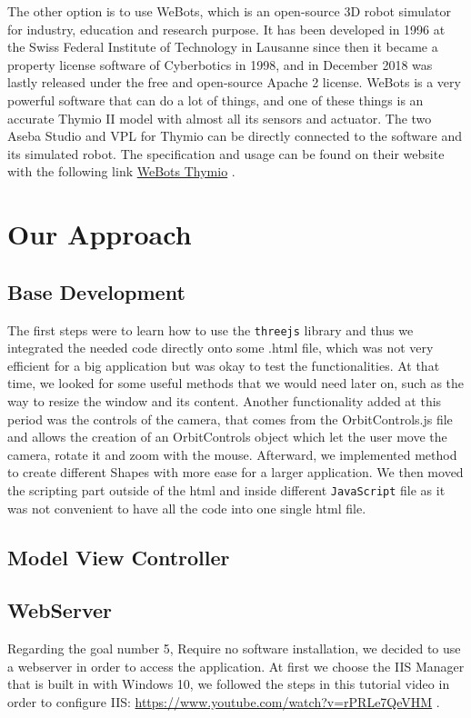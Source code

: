 \documentclass{scrbook}
\begin{document}
The other option is to use WeBots, which is an open-source 3D robot simulator for industry, education and research purpose. 
It has been developed in 1996 at the Swiss Federal Institute of Technology in Lausanne since then it became a property license software of Cyberbotics in 1998, 
and in December 2018 was lastly released under the free and open-source Apache 2 license.
WeBots is a very powerful software that can do a lot of things, and one of these things is an accurate Thymio II model with almost all its sensors and actuator. 
The two Aseba Studio and VPL for Thymio can be directly connected to the software and its simulated robot. 
The specification and usage can be found on their website with the following link \href{https://www.cyberbotics.com/doc/guide/thymio2#mosybas-thymio-ii}{WeBots Thymio} .

\chapter{Our Approach}

\section{Base Development}

The first steps were to learn how to use the \texttt{threejs} library and thus we integrated the needed code directly onto some .html file, which was not very efficient for a big application but was okay to test the functionalities. 
At that time, we looked for some useful methods that we would need later on, such as the way to resize the window and its content. Another functionality added at this period was the controls of the camera, that comes from the OrbitControls.js file and allows the creation of an OrbitControls object which let the user move the camera, rotate it and zoom with the mouse.
Afterward, we implemented method to create different Shapes with more ease for a larger application. We then moved the scripting part outside of the html and inside different \texttt{JavaScript} file as it was not convenient to have all the code into one single html file.


\section{Model View Controller}


\section{WebServer \label{webserver}}
Regarding the goal number 5, Require no software installation, we decided to use a webserver in order to access the application. At first we choose the IIS Manager that is built in with Windows 10, 
we followed the steps in this tutorial video in order to configure IIS: \url{https://www.youtube.com/watch?v=rPRLe7QeVHM} .
\end{document}
